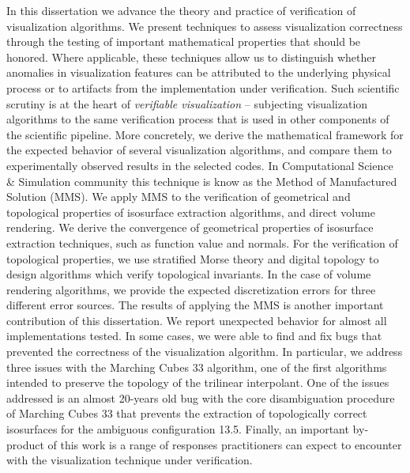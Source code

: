 
In this dissertation we advance the theory and practice of verification of visualization algorithms.
%
We present techniques to assess visualization correctness  through the testing of important mathematical properties that should be honored. Where applicable, these techniques allow us to distinguish
 whether anomalies in visualization features can be attributed to the
  underlying physical process or to artifacts from the implementation under verification.
Such scientific scrutiny is at the heart of {\em
    verifiable visualization} -- subjecting visualization algorithms
  to the same verification process that is used in other components of
  the scientific pipeline.  More concretely, we derive the mathematical framework for
  the expected behavior of several 
  visualization algorithms,
  and compare them to experimentally observed results in the selected
  codes.  In Computational Science \& Simulation community this technique is know as the Method of Manufactured Solution (MMS). We apply MMS to the verification of geometrical and topological properties of isosurface extraction algorithms, and direct volume rendering. 
We derive the convergence of geometrical properties of isosurface extraction techniques, such as function value and normals. For the verification of topological properties, we use stratified Morse theory and digital topology to
design algorithms which verify topological invariants. In the case of volume rendering algorithms, we provide the expected discretization errors for three different error sources.
The results of applying the MMS is another important contribution of this dissertation. 
%
We report unexpected behavior for almost all implementations tested. In some cases, we were able to find and fix bugs that prevented the correctness of the visualization algorithm. 
%
In particular,  we address three issues with the Marching Cubes 33 algorithm, one of the first algorithms intended to preserve the topology of the trilinear interpolant. 
%
One of the issues addressed is an almost 20-years old bug with the core disambiguation procedure of Marching Cubes 33 that prevents the extraction of topologically correct isosurfaces for the ambiguous configuration 13.5.
Finally,  an important by-product of this work is a range of responses practitioners can expect to encounter with the visualization technique under verification. 
  